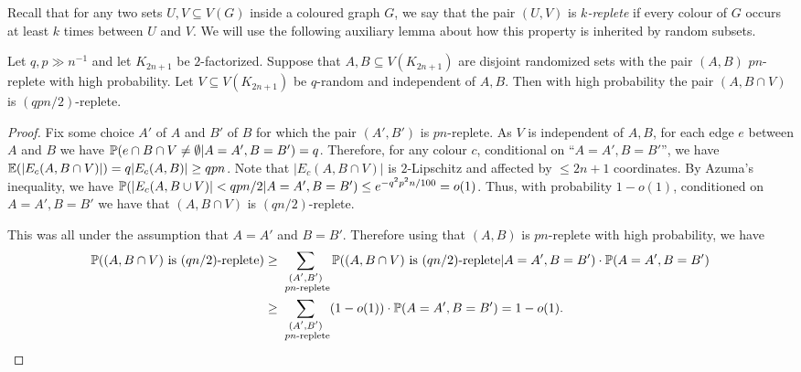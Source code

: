 Recall that  for any two sets $U,V\subseteq V(G)$ inside a coloured graph $G$, we say that the pair $(U,V)$ is \emph{$k$-replete} if every colour of $G$ occurs at least $k$ times between $U$ and $V$.
We will use the following auxiliary lemma about how this property is inherited by random subsets.
\begin{lemma}\label{Lemma_inheritence_of_lower_boundedness_random}
Let $q,  p\gg n^{-1}$  and let  $K_{2n+1}$ be $2$-factorized.
Suppose that $A,B\subseteq V(K_{2n+1})$ are disjoint randomized sets with the pair $(A,B)$   $pn$-replete with high probability.
Let $V\subseteq V(K_{2n+1})$ be $q$-random and independent of $A,B$.
Then with high probability the pair $(A, B\cap V)$ is $(qpn/2)$-replete.
\end{lemma}
\begin{proof}
Fix some choice $A'$ of $A$ and $B'$ of $B$ for which the pair $(A',B')$ is $pn$-replete. As $V$ is independent of $A,B$, for each edge $e$ between $A$ and $B$ we have $\P(e\cap B\cap V\neq \emptyset|A=A', B=B')=q$.
Therefore, for any colour $c$, conditional on ``$A=A', B=B'$'', we have $\E(|E_c(A,B\cap  V)|)=q|E_c(A,B)|\geq qpn$. Note that $|E_c(A,B\cap  V)|$ is $2$-Lipschitz and affected by $\leq 2n+1$ coordinates.
By Azuma's inequality, we have $\P(|E_c(A,B\cup V)|< qpn/2| A=A', B=B')\leq e^{-q^2p^2n/100}= o(1)$. Thus, with probability $1-o(1)$, conditioned on  $A=A', B=B'$ we have that $(A,B\cap V)$ is $(qn/2)$-replete.

This was all under the assumption that $A=A'$ and $B=B'$. 
Therefore using that $(A,B)$ is $pn$-replete with high probability, we have
\begin{align*}
\P(\text{$(A,B\cap V)$ is $(qn/2)$-replete})&\geq \sum_{\substack{(A',B') \\ \text{ $pn$-replete}}}\P(\text{$(A,B\cap V)$ is  $(qn/2)$-replete}|A=A', B=B')\cdot\P(A=A', B=B')\\
&\geq  \sum_{\substack{(A',B') \\ \text{ $pn$-replete}}} (1-o(1))\cdot \P(A=A', B=B')=1-o(1).\qedhere
\end{align*}
\end{proof}



 


